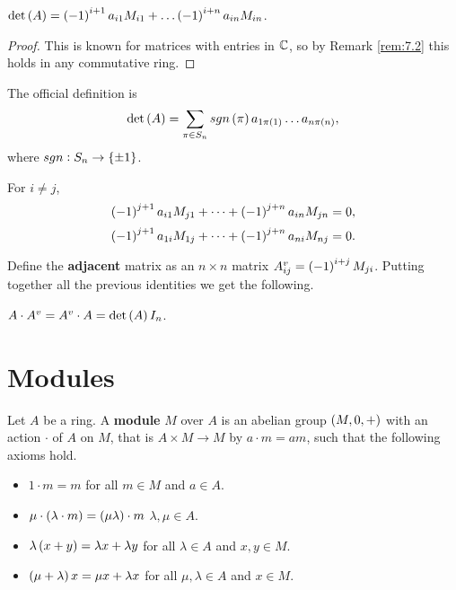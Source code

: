 \begin{proposition}
$ \det\br{A} = \br{-1}^{i + 1}a_{i1}M_{i1} + \dots \br{-1}^{i + n}a_{in}M_{in} $.
\end{proposition}

\begin{proof}
This is known for matrices with entries in $ \mathbb{C} $, so by Remark \ref{rem:7.2} this holds in any commutative ring.
\end{proof}

\begin{remark}
The official definition is
$$ \det\br{A} = \sum_{\pi \in S_n} sgn\br{\pi}a_{1\pi\br{1}} \dots a_{n\pi\br{n}}, $$
where $ sgn : S_n \to \cbr{\pm 1} $.
\end{remark}

\begin{proposition}
For $ i \ne j $,
$$ \br{-1}^{j + 1}a_{i1}M_{j1} + \dots + \br{-1}^{j + n}a_{in}M_{jn} = 0, $$
$$ \br{-1}^{j + 1}a_{1i}M_{1j} + \dots + \br{-1}^{j + n}a_{ni}M_{nj} = 0. $$
\end{proposition}

Define the \textbf{adjacent} matrix as an $ n \times n $ matrix $ A^v_{ij} = \br{-1}^{i + j}M_{ji} $. Putting together all the previous identities we get the following.

\begin{theorem}
$ A \cdot A^v = A^v \cdot A = \det\br{A} I_n $.
\end{theorem}

\pagebreak

\section{Modules}


\begin{definition}
Let $ A $ be a ring. A \textbf{module} $ M $ over $ A $ is an abelian group $ \br{M, 0, +} $ with an action $ \cdot $ of $ A $ on $ M $, that is $ A \times M \to M $ by $ a \cdot m = am $, such that the following axioms hold.
\begin{itemize}
\item $ 1 \cdot m = m $ for all $ m \in M $ and $ a \in A $.
\item $ \mu \cdot \br{\lambda \cdot m} = \br{\mu\lambda} \cdot m $ $ \lambda, \mu \in A $.
\item $ \lambda\br{x + y} = \lambda x + \lambda y $ for all $ \lambda \in A $ and $ x, y \in M $.
\item $ \br{\mu + \lambda}x = \mu x + \lambda x $ for all $ \mu, \lambda \in A $ and $ x \in M $.
\end{itemize}
\end{definition}

